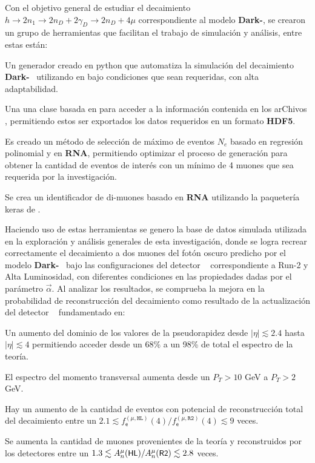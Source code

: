 Con el objetivo general de estudiar el decaimiento $h \rightarrow 2n_1 \rightarrow 2n_D + 2\gamma_D \rightarrow 2n_D + 4\mu$ correspondiente al modelo \textbf{Dark-}\SUSY, se crearon un grupo de herramientas que facilitan el trabajo de simulación y análisis, entre estas están:
\begin{itemize_f}
\item Un generador creado en \textsf{python} que automatiza la simulación del decaimiento \textbf{Dark-}\SUSY~ utilizando en  bajo condiciones que sean requeridas, con alta adaptabilidad.
\item Una una clase basada en  para acceder a la información contenida en los arChivos , permitiendo estos ser exportados los datos requeridos en un formato \textbf{HDF5}.
\item Es creado un método de selección de máximo de eventos $N_e$ basado en regresión polinomial y en \textbf{RNA}, permitiendo optimizar el proceso de generación para obtener la cantidad de eventos de interés con un mínimo de 4 muones que sea requerida por la investigación. 
\item Se crea un identificador de di-muones basado en \textbf{RNA} utilizando la paquetería \textsf{keras} de .
\end{itemize_f}
Haciendo uso de estas herramientas se genero la base de datos simulada utilizada en la exploración y análisis generales de esta investigación, donde se logra recrear correctamente el decaimiento a dos muones del fotón oscuro predicho por el modelo \textbf{Dark-}\SUSY~ bajo las configuraciones del detector \CMS ~ correspondiente a Run-2 y Alta Luminosidad, con diferentes condiciones en las propiedades dadas por el parámetro $\vec{\alpha}$. Al analizar los resultados, se comprueba la mejora en la probabilidad de reconstrucción del decaimiento como resultado de la actualización del detector \CMS~%
fundamentado en:
\begin{itemize_f}
\item Un aumento del dominio de los valores de la pseudorapidez desde $|\eta|\lesssim 2.4$ hasta $|\eta|\lesssim 4$ permitiendo acceder desde un 68\% a un 98\% de total el espectro de la teoría.
\item El espectro del momento transversal aumenta desde un $P_T>10$ GeV a $P_T>2$ GeV.
\item Hay un aumento de la cantidad de eventos con potencial de reconstrucción total del decaimiento entre un $2.1 \lesssim f^{(\mu, \texttt{HL})}_\textsf{e} (4)/f^{(\mu, \texttt{R2})}_\textsf{e} (4) \lesssim 9$ veces.%
\item Se aumenta la cantidad de muones provenientes de la teoría y reconstruidos por los detectores entre un $1.3 \lesssim  A^{\mu}_n(\textsf{\small HL})/A^{\mu}_n(\textsf{\small R2}) \lesssim 2.8$ veces.
\end{itemize_f}
